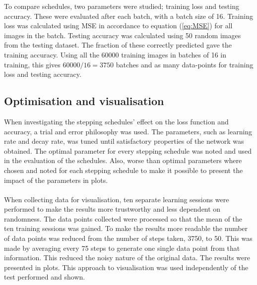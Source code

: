 \documentclass{article}
\begin{document}
\noindent To compare schedules, two parameters were studied; training loss and testing accuracy. These were evaluated after each batch, with a batch size of 16. Training loss was calculated using MSE in accordance to equation (\ref{eq:MSE}) for all images in the batch. Testing accuracy was calculated using 50 random images from the testing dataset. The fraction of these correctly predicted gave the training accuracy. Using all the 60000 training images in batches of 16 in training, this gives $60000/16=3750$ batches and as many data-points for training loss and testing accuracy.

\subsection{Optimisation and visualisation}

When investigating the stepping schedules' effect on the loss function and accuracy, a trial and error philosophy was used.  The parameters, such as learning rate and decay rate, was tuned until satisfactory properties of the network was obtained. The optimal parameter for every stepping schedule was noted and used in the evaluation of the schedules. Also, worse than optimal parameters where chosen and noted for each stepping schedule to make it possible to present the impact of the parameters in plots.\\\\
\noindent When collecting data for visualisation, ten separate learning sessions were performed to make the results more trustworthy and less dependent on randomness. The data points collected were processed so that the mean of the ten training sessions was gained. To make the results more readable the number of data points was reduced from the number of steps taken, 3750, to 50. This was made by averaging every 75 steps to generate one single data point from that information. This reduced the noisy nature of the original data. The results were presented in plots. This approach to visualisation was used independently of the test performed and shown.
\end{document}
